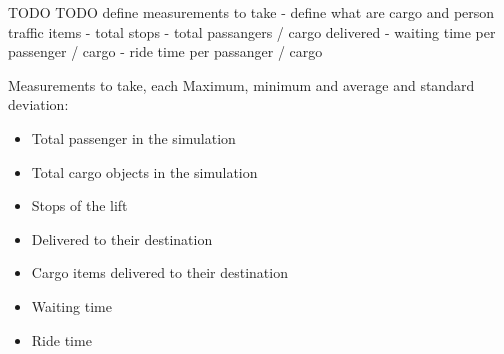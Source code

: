 TODO
TODO define measurements to take
- define what are cargo and person traffic items
- total stops
- total passangers / cargo delivered
- waiting time per passenger / cargo
- ride time per passanger / cargo

Measurements to take, each Maximum, minimum and average and standard deviation:
\begin{samepage}
\begin{itemize}
    \item Total passenger in the simulation
    \item Total cargo objects in the simulation
    \item Stops of the lift
    \item Delivered to their destination
    \item Cargo items delivered to their destination
    \item Waiting time
    \item Ride time
\end{itemize}
\end{samepage}
 

